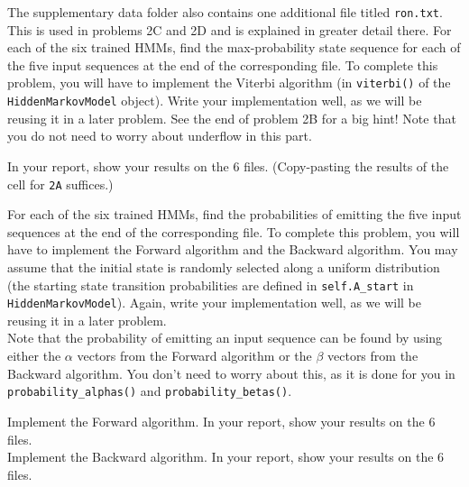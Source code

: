 The supplementary data folder also contains one additional file titled \texttt{ron.txt}. This is used in problems 2C and 2D and is explained in greater detail there. 
\indent\problem[10] %
For each of the six trained HMMs, find the max-probability state sequence for each of the five input sequences at the end of the corresponding file. To complete this problem, you will have to implement the Viterbi algorithm (in \texttt{viterbi()} of the \texttt{HiddenMarkovModel} object). Write your implementation well, as we will be reusing it in a later problem. See the end of problem 2B for a big hint! Note that you do not need to worry about underflow in this part.

In your report, show your results on the 6 files. (Copy-pasting the results of the cell for \texttt{2A} suffices.)
\begin{solution}
\end{solution}
\indent\problem[17] %
For each of the six trained HMMs, find the probabilities of emitting the five input sequences at the end of the corresponding file. To complete this problem, you will have to implement the Forward algorithm and the Backward algorithm. You may assume that the initial state is randomly selected along a uniform distribution (the starting state transition probabilities are defined in \texttt{self.A\_start} in \texttt{HiddenMarkovModel}). Again, write your implementation well, as we will be reusing it in a later problem. \\

Note that the probability of emitting an input sequence can be found by using either the $\alpha$ vectors from the Forward algorithm or the $\beta$ vectors from the Backward algorithm. You don't need to worry about this, as it is done for you in \texttt{probability\_alphas()} and \texttt{probability\_betas()}.

Implement the Forward algorithm. In your report, show your results on the 6 files. \\
Implement the Backward algorithm. In your report, show your results on the 6 files. \\

